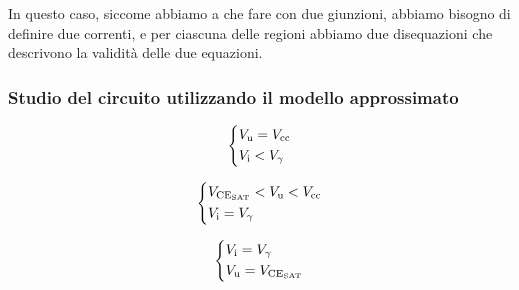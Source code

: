 \documentclass[../elettronica]{subfiles}
\begin{document}
\noindent
In questo caso, siccome abbiamo a che fare con due giunzioni, abbiamo bisogno di definire due correnti, e per ciascuna delle regioni
abbiamo due disequazioni che descrivono la validità delle due equazioni.

\subsubsection{Studio del circuito utilizzando il modello approssimato}
\begin{minipage}{.32\textwidth}
    \begin{tcolorbox}[title=OFF]
        \[\begin{cases*}
            \vu = \V{cc}\\
            \vi < V_\gamma
        \end{cases*}\]
    \end{tcolorbox}
\end{minipage}
\begin{minipage}{.33\textwidth}
    \begin{tcolorbox}[title=AD]
        \vspace{-1em}
        \[\begin{cases*}
            \vcesat < \vu < \V{cc}\\
            \vi = V_\gamma
        \end{cases*}\]
    \end{tcolorbox}
\end{minipage}
\begin{minipage}{.33\textwidth}
    \begin{tcolorbox}[title=SAT]
        \[\begin{cases*}
            \vi = V_\gamma\\
            \vu = \vcesat
        \end{cases*}\]
    \end{tcolorbox}
\end{minipage}
\begin{wrapfigure}{r}{0pt}
\end{wrapfigure}
\end{document}
